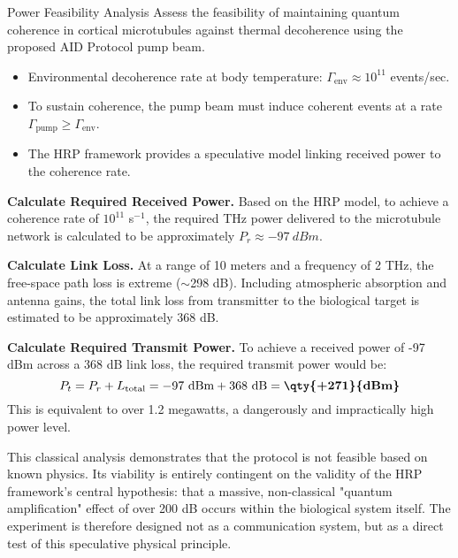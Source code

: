 \begin{workedexample}{Power Feasibility Analysis}
     Assess the feasibility of maintaining quantum coherence in cortical microtubules against thermal decoherence using the proposed AID Protocol pump beam.
    \begin{itemize}
        \item Environmental decoherence rate at body temperature: $\Gamma_{\text{env}} \approx 10^{11}$ events/sec.
        \item To sustain coherence, the pump beam must induce coherent events at a rate $\Gamma_{\text{pump}} \ge \Gamma_{\text{env}}$.
        \item The HRP framework provides a speculative model linking received power to the coherence rate.
    \end{itemize}
    \begin{derivationsteps}
        \step \textbf{Calculate Required Received Power.} Based on the HRP model, to achieve a coherence rate of $10^{11}$ s$^{-1}$, the required THz power delivered to the microtubule network is calculated to be approximately $P_r \approx \qty{-97}{dBm}$.
        
        \step \textbf{Calculate Link Loss.} At a range of 10 meters and a frequency of 2 THz, the free-space path loss is extreme ($\sim$298 dB). Including atmospheric absorption and antenna gains, the total link loss from transmitter to the biological target is estimated to be approximately 368 dB.
        
        \step \textbf{Calculate Required Transmit Power.} To achieve a received power of -97 dBm across a 368 dB link loss, the required transmit power would be:
        \[ P_t = P_r + L_{\text{total}} = -97 \text{ dBm} + 368 \text{ dB} = \textbf{\qty{+271}{dBm}} \]
        This is equivalent to over 1.2 megawatts, a dangerously and impractically high power level.
    \end{derivationsteps}
     This classical analysis demonstrates that the protocol is not feasible based on known physics. Its viability is entirely contingent on the validity of the HRP framework's central hypothesis: that a massive, non-classical "quantum amplification" effect of over 200 dB occurs within the biological system itself. The experiment is therefore designed not as a communication system, but as a direct test of this speculative physical principle.
\end{workedexample}


